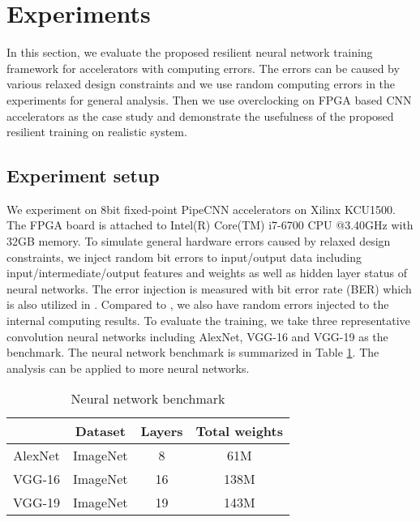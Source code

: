 \section{Experiments} \label{sec:casestudy}
In this section, we evaluate the proposed resilient neural network training 
framework for accelerators with computing errors. The errors can be caused by 
various relaxed design constraints and we use random computing errors in 
the experiments for general analysis. Then we use overclocking on FPGA based 
CNN accelerators as the case study and demonstrate the usefulness of the 
proposed resilient training on realistic system.

\subsection{Experiment setup}
We experiment on 8bit fixed-point PipeCNN \cite{pipecnn_2} accelerators on Xilinx KCU1500.
The FPGA board is attached to Intel(R) Core(TM) i7-6700 CPU @3.40GHz with 32GB memory.
To simulate general hardware errors caused by relaxed design constraints, we 
inject random bit errors to input/output data including 
input/intermediate/output features and weights as well as 
hidden layer status of neural networks. The error injection is measured with 
bit error rate (BER) which is also utilized in \cite{B2018ARES}. Compared to \cite{B2018ARES},
we also have random errors injected to the internal computing results. 
To evaluate the training, we take three representative convolution 
neural networks including AlexNet, VGG-16 and VGG-19 as the benchmark. 
The neural network benchmark is summarized in Table \ref{tab:CNN-table}. 
The analysis can be applied to more neural networks.

\begin{table}[h]
        \centering
        \vspace{-0.3em}
        \caption{Neural network benchmark}
        \label{tab:CNN-table}
        \vspace{-0.3em}
        \begin{tabular}{c|c|c|c}
		\toprule
		  & Dataset & Layers & Total weights \\
		\midrule
		AlexNet & ImageNet & 8 & 61M \\
		\midrule
		VGG-16 & ImageNet & 16 & 138M \\
		\midrule
		VGG-19 & ImageNet & 19 & 143M \\
		\bottomrule
        \end{tabular}
        \vspace{-1em}
\end{table}

